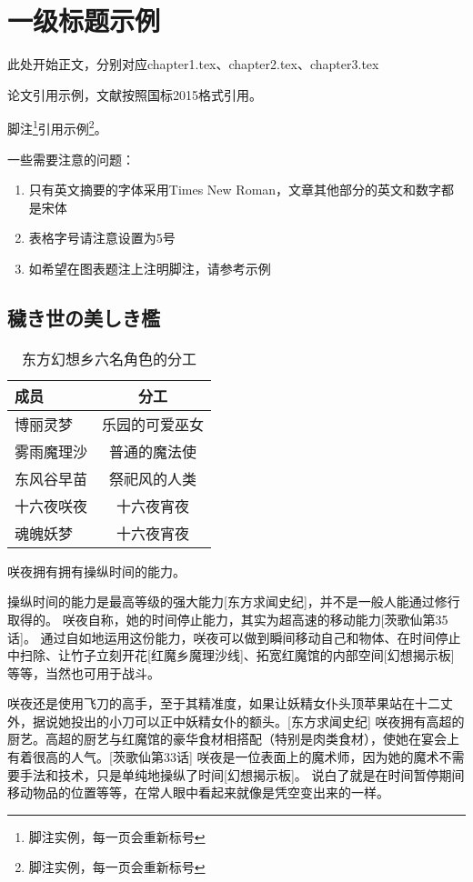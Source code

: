 \chapter{一级标题示例}
此处开始正文，分别对应chapter1.tex、chapter2.tex、chapter3.tex

论文引用示例\cite{王宣承-1}，文献按照国标2015格式引用。

脚注\footnote{脚注实例，每一页会重新标号}引用示例\footnote{脚注实例，每一页会重新标号}。

一些需要注意的问题：
\begin{enumerate}
    \item 只有英文摘要的字体采用Times New Roman，文章其他部分的英文和数字都是宋体
    \item 表格字号请注意设置为5号
    \item 如希望在图表题注上注明脚注，请参考示例
\end{enumerate}

\section{穢き世の美しき檻}

\begin{table}
    \centering
    \small
    \caption{东方幻想乡六名角色的分工}
    \begin{tabular}{lc}
        \toprule[1.5bp]
        成员    & 分工      \\
        \midrule[0.75bp]
        博丽灵梦  & 乐园的可爱巫女 \\
        雾雨魔理沙 & 普通的魔法使  \\
        东风谷早苗 & 祭祀风的人类  \\
        十六夜咲夜 & 十六夜宵夜   \\
        魂魄妖梦  & 十六夜宵夜   \\
        \bottomrule[1.5bp]
    \end{tabular}
    \vspace{22bp}
\end{table}

咲夜拥有拥有操纵时间的能力。

操纵时间的能力是最高等级的强大能力[东方求闻史纪]，并不是一般人能通过修行取得的。
咲夜自称，她的时间停止能力，其实为超高速的移动能力[茨歌仙第35话]。
通过自如地运用这份能力，咲夜可以做到瞬间移动自己和物体、在时间停止中扫除、让竹子立刻开花[红魔乡魔理沙线]、拓宽红魔馆的内部空间[幻想揭示板]等等，当然也可用于战斗。

咲夜还是使用飞刀的高手，至于其精准度，如果让妖精女仆头顶苹果站在十二丈外，据说她投出的小刀可以正中妖精女仆的额头。[东方求闻史纪]
咲夜拥有高超的厨艺。高超的厨艺与红魔馆的豪华食材相搭配（特别是肉类食材），使她在宴会上有着很高的人气。[茨歌仙第33话]
咲夜是一位表面上的魔术师，因为她的魔术不需要手法和技术，只是单纯地操纵了时间[幻想揭示板]。 说白了就是在时间暂停期间移动物品的位置等等，在常人眼中看起来就像是凭空变出来的一样。
